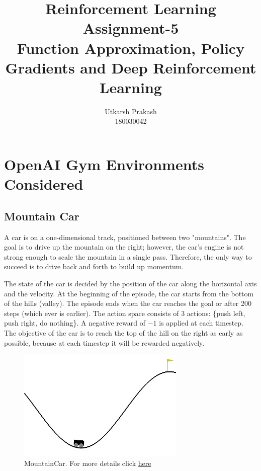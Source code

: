 \documentclass{article}
\title{Reinforcement Learning Assignment-5 \\
	\Large Function Approximation, Policy Gradients and Deep Reinforcement Learning \\}
\begin{document}
\author{Utkarsh Prakash \\ \normalsize 180030042}
\maketitle
\section{OpenAI Gym Environments Considered}
    \subsection{Mountain Car}
    A car is on a one-dimensional track, positioned between two "mountains". The goal is to drive up the mountain on the right; 
    however, the car's engine is not strong enough to scale the mountain in a single pass. Therefore, the only way to succeed is to 
    drive back and forth to build up momentum. \par

    \noindent %
    The state of the car is decided by the position of the car along the horizontal axis and the velocity. At the beginning of the
    episode, the car starts from the bottom of the hills (valley). The episode ends when the car reaches the goal or after
    200 steps (which ever is earlier). The action space consists of 3 actions: \{push left, push right, do nothing\}. A negative reward
    of $-1$ is applied at each timestep. The objective of the car is to reach the top of the hill on the right as early as possible, 
    because at each timestep it will be rewarded negatively. \par

    \begin{figure}[H]
        \graphicspath{ {../tmp/} }
        \begin{center}
        \includegraphics[width=8cm]{mountain_car.jpg}
        \end{center}
        \caption{MountainCar. For more details click \href{https://gym.openai.com/envs/MountainCar-v0/}{here} }
        \label{mountain_car}
    \end{figure}
\end{document}
